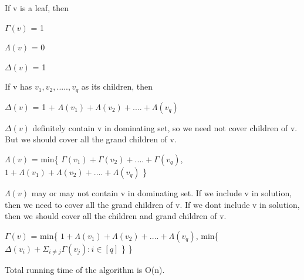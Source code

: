 If v is a leaf, then 

\hspace*{2cm} $\Gamma(v)$ = 1

\hspace*{2cm} $\Lambda(v)$ = 0

\hspace*{2cm}$\Delta(v)$ = 1


If v has $v_1, v_2, ....., v_q$ as its children, then 

\hspace*{2cm} $\Delta(v)$ = 1 + $\Lambda(v_1)+\Lambda(v_2)+....+\Lambda(v_q)$

$\Delta(v)$ definitely contain v in dominating set, so we need not cover children of v. 
But we should cover all the grand children of v.

\hspace*{2cm} $\Lambda(v)$ = min\{ $\Gamma(v_1) + \Gamma(v_2) + .... + \Gamma(v_q)$,  
$1 + \Lambda(v_1)+\Lambda(v_2)+....+\Lambda(v_q)$ \}

$\Lambda(v)$ may or may not contain v in dominating set. If we include v in solution,
then we need to cover all the grand children of v. If we dont include v in solution, then
we should cover all the children and grand children of v.

\hspace*{2cm} $\Gamma(v)$ = min\{ $1 + \Lambda(v_1)+\Lambda(v_2)+....+\Lambda(v_q)$,
min\{$\Delta(v_i) + \Sigma_{i \neq j} \Gamma(v_j) : i \in [q] $ \} \}

Total running time of the algorithm is O(n).





